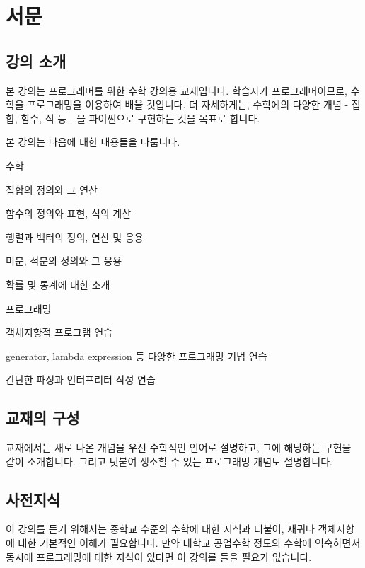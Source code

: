 \chapter*{서문}

\section*{강의 소개}
본 강의는 프로그래머를 위한 수학 강의용 교재입니다. 학습자가 프로그래머이므로, 수학을 프로그래밍을 이용하여 배울 것입니다. 더 자세하게는, 수학에의 다양한 개념 - 집합, 함수, 식 등 - 을 파이썬으로 구현하는 것을 목표로 합니다.  

본 강의는 다음에 대한 내용들을 다룹니다. 

\begin{compactitem} 
\item 수학 
\begin{compactitem} 
\item 집합의 정의와 그 연산 
\item 함수의 정의와 표현, 식의 계산 
\item 행렬과 벡터의 정의, 연산 및 응용 
\item 미분, 적분의 정의와 그 응용 
\item 확률 및 통계에 대한 소개 
\end{compactitem}
\item 프로그래밍 
\begin{compactitem} 
\item 객체지향적 프로그램 연습 
\item generator, lambda expression 등 다양한 프로그래밍 기법 연습
\item 간단한 파싱과 인터프리터 작성 연습
\end{compactitem}
\end{compactitem}

\section*{교재의 구성} 

교재에서는 새로 나온 개념을 우선 수학적인 언어로 설명하고, 그에 해당하는 구현을 같이 소개합니다. 그리고 덧붙여 생소할 수 있는 프로그래밍 개념도 설명합니다.


\section*{사전지식}

이 강의를 듣기 위해서는 중학교 수준의 수학에 대한 지식과 더불어, 재귀나 객체지향에 대한 기본적인 이해가 필요합니다. 만약 대학교 공업수학 정도의 수학에 익숙하면서 동시에 프로그래밍에 대한 지식이 있다면 이 강의를 들을 필요가 없습니다. 


